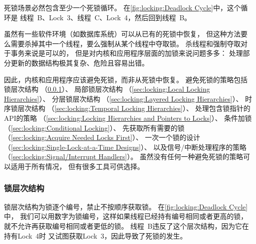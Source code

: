 死锁场景必然包含至少一个死锁循环。
在\cref{fig:locking:Deadlock Cycle}中，这个循环是
线程~B、Lock~3、线程~C、Lock~4，然后回到线程~B。

\QuickQuizEnd

虽然有一些软件环境（如数据库系统）可以从已有的死锁中恢复，
但这种方法要么需要杀掉其中一个线程，要么强制从某个线程中夺取锁。
杀线程和强制夺取对于事务来说是可以的，
但是对内核和应用程序层面的加锁来说问题多多：
处理部分更新的数据结构极其复杂、危险且容易出错。

因此，内核和应用程序应该避免死锁，而非从死锁中恢复。
避免死锁的策略包括锁层次结构
（\cref{sec:locking:Locking Hierarchies}）、
局部锁层次结构
（\cref{sec:locking:Local Locking Hierarchies}）、
分层锁层次结构
（\cref{sec:locking:Layered Locking Hierarchies}）、
时序锁层次结构
（\cref{sec:locking:Temporal Locking Hierarchies}）、
处理包含锁指针的API的策略
（\cref{sec:locking:Locking Hierarchies and Pointers to Locks}）、
条件加锁
（\cref{sec:locking:Conditional Locking}）、
先获取所有需要的锁
（\cref{sec:locking:Acquire Needed Locks First}）、
一次一个锁的设计
（\cref{sec:locking:Single-Lock-at-a-Time Designs}）、
以及信号/中断处理程序的策略
（\cref{sec:locking:Signal/Interrupt Handlers}）。
虽然没有任何一种避免死锁的策略可以适用于所有情况，
但有很多工具可供选择。

\subsubsection{锁层次结构}
\label{sec:locking:Locking Hierarchies}

锁层次结构为锁逐个编号，禁止不按顺序获取锁。
在\cref{fig:locking:Deadlock Cycle}中，
我们可以用数字为锁编号，这样如果线程已经持有编号相同或者更高的锁，
就不允许再获取编号相同或者更低的锁。
线程~B违反了这个层次结构，因为它在持有Lock~4时
又试图获取Lock~3，因此导致了死锁的发生。

